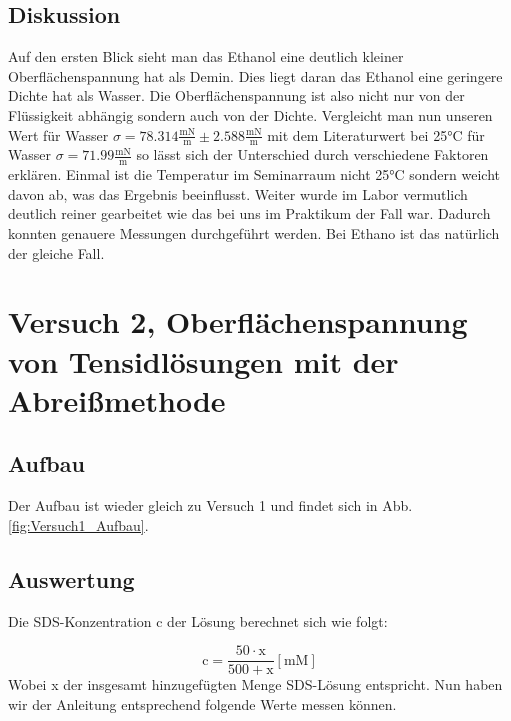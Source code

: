         \subsection{Diskussion}
        Auf den ersten Blick sieht man das Ethanol eine deutlich kleiner Oberflächenspannung hat als Demin. Dies liegt daran das Ethanol eine geringere Dichte hat als Wasser. Die Oberflächenspannung ist also nicht nur von der Flüssigkeit abhängig sondern auch von der Dichte. Vergleicht man nun unseren Wert für Wasser $\sigma = 78.314 \frac{\mathrm{mN}}{\mathrm{m}} \pm 2.588 \frac{\mathrm{mN}}{\mathrm{m}}$ mit dem Literaturwert bei 25°C für Wasser $\sigma = 71.99 \frac{\mathrm{mN}}{\mathrm{m}}$ so lässt sich der Unterschied durch verschiedene Faktoren erklären. Einmal ist die Temperatur im Seminarraum nicht 25°C sondern weicht davon ab, was das Ergebnis beeinflusst. Weiter wurde im Labor vermutlich deutlich reiner gearbeitet wie das bei uns im Praktikum der Fall war. Dadurch konnten genauere Messungen durchgeführt werden. Bei Ethano ist das natürlich der gleiche Fall.
    \section{Versuch 2, Oberflächenspannung von Tensidlösungen mit der Abreißmethode}

        \subsection{Aufbau}
            Der Aufbau ist wieder gleich zu Versuch 1 und findet sich in Abb. \ref{fig:Versuch1_Aufbau}. 

        \subsection{Auswertung}
            Die SDS-Konzentration $\mathrm{c}$ der Lösung berechnet sich wie folgt:

        \begin{equation}
            \mathrm{c} = \frac{50 \cdot \mathrm{x}}{500  + \mathrm{x} }\mathrm{[mM]}
            \label{eq:Konzentration}
        \end{equation}
        Wobei x der insgesamt hinzugefügten Menge SDS-Lösung entspricht.
        Nun haben wir der Anleitung entsprechend folgende Werte messen können.

